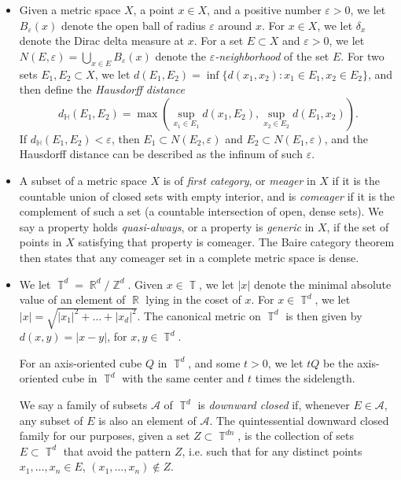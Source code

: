 \documentclass[dvipsnames,letterpaper,12pt]{article}
\numberwithin{equation}{section}
\DeclareMathOperator{\RR}{\mathbb{R}}
\DeclareMathOperator{\ZZ}{\mathbb{Z}}
\DeclareMathOperator{\TT}{\mathbb{T}}
\numberwithin{theorem}{section}
\begin{document}
\begin{itemize}

    \item Given a metric space $X$, a point $x \in X$, and a positive number $\varepsilon > 0$, we let $B_\varepsilon(x)$ denote the open ball of radius $\varepsilon$ around $x$. For $x \in X$, we let $\delta_x$ denote the Dirac delta measure at $x$. For a set $E \subset X$ and $\varepsilon > 0$, we let $N(E,\varepsilon) = \bigcup_{x \in E} B_\varepsilon(x)$ denote the \emph{$\varepsilon$-neighborhood} of the set $E$. For two sets $E_1,E_2 \subset X$, we let $d(E_1,E_2) = \inf \{ d(x_1,x_2) : x_1 \in E_1, x_2 \in E_2 \}$, and then define the \emph{Hausdorff distance}
    \[ d_{\mathbb{H}}(E_1,E_2) = \max \left( \sup_{x_1 \in E_1} d(x_1,E_2), \sup_{x_2 \in E_2} d(E_1,x_2) \right). \]
    If $d_{\mathbb{H}}(E_1,E_2) < \varepsilon$, then $E_1 \subset N(E_2,\varepsilon)$ and $E_2 \subset N(E_1,\varepsilon)$, and the Hausdorff distance can be described as the infinum of such $\varepsilon$.

    \item A subset of a metric space $X$ is of \emph{first category}, or \emph{meager} in $X$ if it is the countable union of closed sets with empty interior, and is \emph{comeager} if it is the complement of such a set (a countable intersection of open, dense sets). We say a property holds \emph{quasi-always}, or a property is \emph{generic} in $X$, if the set of points in $X$ satisfying that property is comeager. The Baire category theorem then states that any comeager set in a complete metric space is dense.

    \item We let $\TT^d = \RR^d/\ZZ^d$. Given $x \in \TT$, we let $|x|$ denote the minimal absolute value of an element of $\RR$ lying in the coset of $x$. For $x \in \TT^d$, we let $|x| = \sqrt{|x_1|^2 + \dots + |x_d|^2}$. The canonical metric on $\TT^d$ is then given by $d(x,y) = |x - y|$, for $x,y \in \TT^d$.

    For an axis-oriented cube $Q$ in $\TT^d$, and some $t > 0$, we let $tQ$ be the axis-oriented cube in $\TT^d$ with the same center and $t$ times the sidelength.

    We say a family of subsets $\mathcal{A}$ of $\TT^d$ is \emph{downward closed} if, whenever $E \in \mathcal{A}$, any subset of $E$ is also an element of $\mathcal{A}$. The quintessential downward closed family for our purposes, given a set $Z \subset \TT^{dn}$, is the collection of sets $E \subset \TT^d$ that avoid the pattern $Z$, i.e. such that for any distinct points $x_1,\dots,x_n \in E$, $(x_1,\dots,x_n) \not \in Z$.


\end{itemize}
\end{document}
